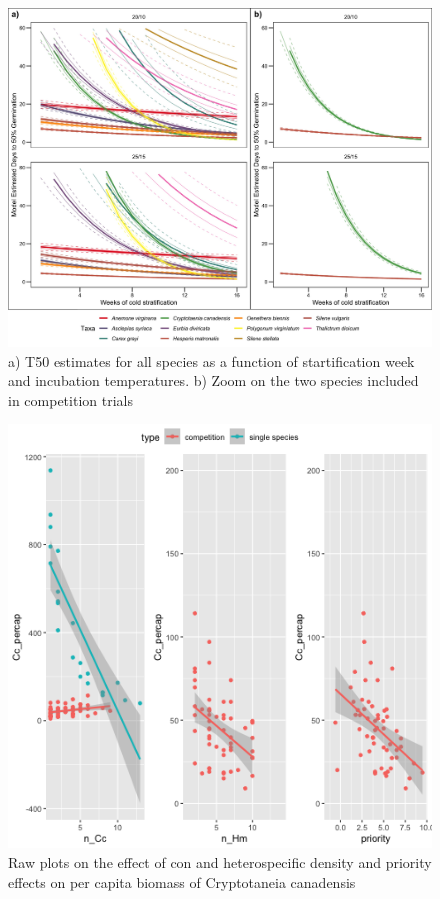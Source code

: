 \documentclass[11pt]{article}\usepackage[]{graphicx}\usepackage[]{color}
\begin{document}
\begin{figure}[h!]
    \centering
         \includegraphics[width=\textwidth]{..//figure/AFTplots_spcomp.jpeg}
    \caption{a) T50 estimates for all species as a function of startification week and incubation temperatures. b) Zoom on the two species included in competition trials } 
    \label{fig:aft}
\end{figure}

\begin{figure}[h!]
    \centering
\includegraphics[width=\textwidth]{..//figure/cryp_plots.png}
    \caption{Raw plots on the effect of con and heterospecific density and priority effects on per capita biomass of Cryptotaneia canadensis } 
    \label{fig:Cc}
\end{figure}
\end{document}
